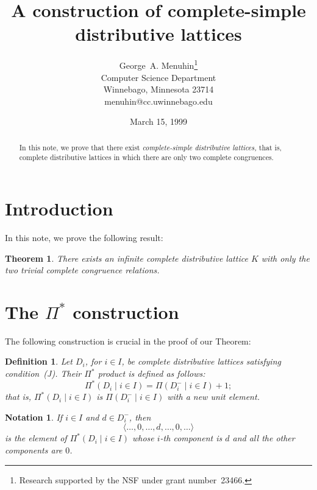 \documentclass{article}
\newtheorem{theorem}{Theorem}
\newtheorem{definition}{Definition}
\newtheorem{notation}{Notation}
\begin{document}
\title{A construction of complete-simple\\  
       distributive lattices}
\author{George~A. Menuhin\thanks{Research supported 
   by the NSF under grant number~23466.}\\
   Computer Science Department\\
   Winnebago, Minnesota 23714\\
   menuhin@cc.uwinnebago.edu} 
\date{March 15, 1999}
\maketitle

\begin{abstract}
   In this note, we prove that there exist \emph{complete-simple
   distributive lattices,} that is, complete distributive 
   lattices in which there are only two complete congruences. 
\end{abstract}

\section{Introduction}\label{S:intro} 
In this note, we prove the following result:

\begin{theorem} 
   There exists an infinite complete distributive lattice $K$
   with only the two trivial complete congruence relations.
\end{theorem}

\section{The $\Pi^{*}$ construction}\label{S:P*} 
The following construction is crucial in the proof of our Theorem:

\begin{definition}\label{D:P*} 
   Let $D_{i}$, for $i \in I$, be complete distributive 
   lattices satisfying condition~\textup{(J)}.  Their 
   $\Pi^{*}$ product is defined as follows:
   \[
      \Pi^{*} ( D_{i} \mid i \in I ) = 
       \Pi ( D_{i}^{-} \mid i \in I ) + 1;
   \]
   that is, $\Pi^{*} ( D_{i} \mid i \in I )$ is 
   $\Pi ( D_{i}^{-} \mid i \in I )$ with a new unit element. 
\end{definition}

\begin{notation}
   If $i \in I$ and $d \in D_{i}^{-}$, then
   \[
      \langle \ldots, 0, \ldots, d, \ldots, 0, \ldots \rangle
   \]
   is the element of $\Pi^{*} ( D_{i} \mid i \in I )$ whose 
   $i$-th component is $d$ and all the other components 
   are $0$.
\end{notation}
\end{document}
